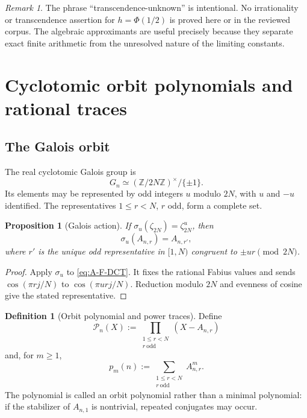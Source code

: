 \documentclass[11pt,oneside]{article}
\newtheorem{proposition}[theorem]{Proposition}
\theoremstyle{definition}
\newtheorem{definition}[theorem]{Definition}
\theoremstyle{remark}
\newtheorem{remark}[theorem]{Remark}
\newcommand{\Z}{\mathbb Z}
\newcommand{\PhiU}{\Phi}
\begin{document}
\begin{remark}
The phrase ``transcendence-unknown'' is intentional.  No irrationality or
transcendence assertion for $h=\PhiU(1/2)$ is proved here or in the reviewed
corpus.  The algebraic approximants are useful precisely because they separate
exact finite arithmetic from the unresolved nature of the limiting constants.
\end{remark}

\section{Cyclotomic orbit polynomials and rational traces}\label{sec:cyclotomic}

\subsection{The Galois orbit}

The real cyclotomic Galois group is
\begin{equation}\label{eq:G-n}
 G_n\simeq(\Z/2N\Z)^{\times}/\{\pm1\}.
\end{equation}
Its elements may be represented by odd integers $u$ modulo $2N$, with $u$ and
$-u$ identified.  The representatives $1\le r<N$, $r$ odd, form a complete
set.

\begin{proposition}[Galois action]\label{prop:Galois-action}
If $\sigma_u(\zeta_{2N})=\zeta_{2N}^u$, then
\begin{equation}\label{eq:Galois-action}
 \sigma_u(A_{n,r})=A_{n,r'},
\end{equation}
where $r'$ is the unique odd representative in $[1,N)$ congruent to
$\pm ur\pmod{2N}$.
\end{proposition}

\begin{proof}
Apply $\sigma_u$ to \eqref{eq:A-F-DCT}.  It fixes the rational Fabius values and
sends
$\cos(\pi rj/N)$ to $\cos(\pi urj/N)$.  Reduction modulo $2N$ and evenness of
cosine give the stated representative.
\end{proof}

\begin{definition}[Orbit polynomial and power traces]\label{def:orbit-poly}
Define
\begin{equation}\label{eq:orbit-poly}
 \mathcal P_n(X):=
 \prod_{\substack{1\le r<N\\r\ \mathrm{odd}}}(X-A_{n,r})
\end{equation}
and, for $m\ge1$,
\begin{equation}\label{eq:p-m-n}
 p_m(n):=\sum_{\substack{1\le r<N\\r\ \mathrm{odd}}}A_{n,r}^m.
\end{equation}
The polynomial is called an orbit polynomial rather than a minimal polynomial:
if the stabilizer of $A_{n,1}$ is nontrivial, repeated conjugates may occur.
\end{definition}
\end{document}
